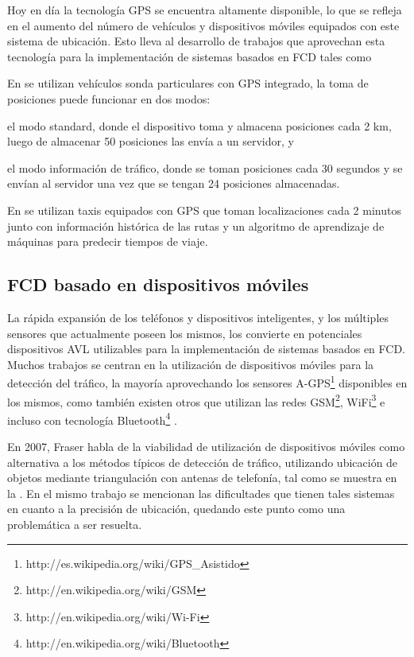 Hoy en día la tecnología GPS se encuentra altamente disponible, lo que se refleja en el aumento del número de vehículos y dispositivos móviles equipados con este sistema de ubicación. Esto lleva al desarrollo de trabajos que aprovechan esta tecnología para la implementación de sistemas basados en FCD tales como  \citep{giovannini2011novel,li2007practical,sevlian2010travel,yin2004weight}

En \citep{giovannini2011novel} se utilizan vehículos sonda particulares con GPS integrado, la toma de posiciones puede funcionar en dos modos: \begin{enumerate*}[1)] \item el modo standard, donde el dispositivo toma y almacena posiciones cada 2 km, luego de almacenar 50 posiciones las envía a un servidor, y \item el modo información de tráfico, donde se toman posiciones cada 30 segundos y se envían al servidor una vez que se tengan 24 posiciones almacenadas.\end{enumerate*}

En \citep{sevlian2010travel} se utilizan taxis equipados con GPS que toman localizaciones cada 2 minutos junto con información histórica de las rutas y un algoritmo de aprendizaje de máquinas para predecir tiempos de viaje.

\subsection{FCD basado en dispositivos móviles}

La rápida expansión de los teléfonos y dispositivos inteligentes, y los múltiples sensores que actualmente poseen los mismos, los convierte en potenciales dispositivos AVL utilizables para la implementación de sistemas basados en FCD. Muchos trabajos se centran en la utilización de dispositivos móviles para la detección del tráfico, la mayoría aprovechando los sensores A-GPS\footnote{http://es.wikipedia.org/wiki/GPS\_Asistido} disponibles en los mismos, como también existen otros que utilizan las redes GSM\footnote{http://en.wikipedia.org/wiki/GSM}, WiFi\footnote{http://en.wikipedia.org/wiki/Wi-Fi} e incluso con tecnología Bluetooth\footnote{http://en.wikipedia.org/wiki/Bluetooth} \citep{thiagarajan2010cooperative,thiagarajan2009vtrack,fraser2007use,fang2011enacq,ruppe2012augmenting}.

En 2007, Fraser \citep{fraser2007use} habla de la viabilidad de utilización de dispositivos móviles como alternativa a los métodos típicos de detección de tráfico, utilizando ubicación de objetos mediante triangulación con antenas de telefonía, tal como se muestra en la . En el mismo trabajo se mencionan las dificultades que tienen tales sistemas en cuanto a la precisión de ubicación, quedando este punto como una problemática a ser resuelta.

